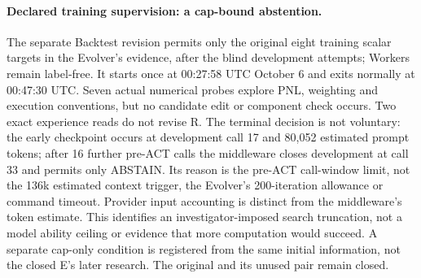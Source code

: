 \paragraph{Declared training supervision: a cap-bound abstention.}
The separate Backtest revision permits only the original eight training
scalar targets in the Evolver's evidence, after the blind development attempts;
Workers remain label-free. It starts once at 00:27:58 UTC October 6 and
exits normally at 00:47:30 UTC. Seven actual numerical probes explore PNL,
weighting and execution conventions, but no candidate edit or component
check occurs. Two exact experience reads do not revise R.
The terminal decision is not voluntary: the early checkpoint occurs at
development call 17 and 80{,}052 estimated prompt tokens; after 16 further
pre-ACT calls the middleware closes development at call 33 and permits only
ABSTAIN. Its reason is the pre-ACT call-window limit, not the 136k estimated
context trigger, the Evolver's 200-iteration allowance or command timeout.
Provider input accounting is distinct from the middleware's token estimate.
This identifies an investigator-imposed search truncation, not a model
ability ceiling or evidence that more computation would succeed. A separate
cap-only condition is registered from the same initial information, not the
closed E's later research. The original and its unused pair remain closed.

